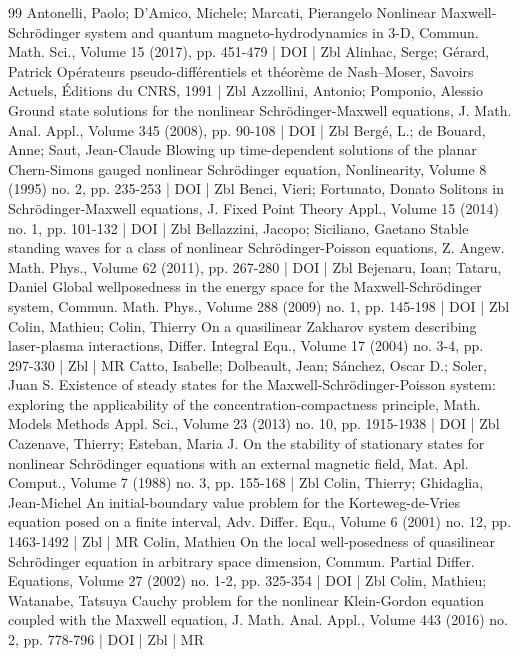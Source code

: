 \documentclass[10pt]{amsart}
\theoremstyle{definition}\newtheorem{defi}[theo]{Definition}\newtheorem{rema}[theo]{Remark}\newtheorem{exam}[theo]{Example}\newtheorem{exem}[theo]{Example}\newtheorem{nota}[theo]{Notation}
\begin{document}
\begin{thebibliography}{99}
Antonelli, Paolo; D’Amico, Michele; Marcati, Pierangelo Nonlinear Maxwell-Schrödinger system and quantum magneto-hydrodynamics in 3-D, Commun. Math. Sci., Volume 15 (2017), pp. 451-479 | DOI | Zbl
Alinhac, Serge; Gérard, Patrick Opérateurs pseudo-différentiels et théorème de Nash–Moser, Savoirs Actuels, Éditions du CNRS, 1991 | Zbl
Azzollini, Antonio; Pomponio, Alessio Ground state solutions for the nonlinear Schrödinger-Maxwell equations, J. Math. Anal. Appl., Volume 345 (2008), pp. 90-108 | DOI | Zbl
Bergé, L.; de Bouard, Anne; Saut, Jean-Claude Blowing up time-dependent solutions of the planar Chern-Simons gauged nonlinear Schrödinger equation, Nonlinearity, Volume 8 (1995) no. 2, pp. 235-253 | DOI | Zbl
Benci, Vieri; Fortunato, Donato Solitons in Schrödinger-Maxwell equations, J. Fixed Point Theory Appl., Volume 15 (2014) no. 1, pp. 101-132 | DOI | Zbl
Bellazzini, Jacopo; Siciliano, Gaetano Stable standing waves for a class of nonlinear Schrödinger-Poisson equations, Z. Angew. Math. Phys., Volume 62 (2011), pp. 267-280 | DOI | Zbl
Bejenaru, Ioan; Tataru, Daniel Global wellposedness in the energy space for the Maxwell-Schrödinger system, Commun. Math. Phys., Volume 288 (2009) no. 1, pp. 145-198 | DOI | Zbl
Colin, Mathieu; Colin, Thierry On a quasilinear Zakharov system describing laser-plasma interactions, Differ. Integral Equ., Volume 17 (2004) no. 3-4, pp. 297-330 | Zbl | MR
Catto, Isabelle; Dolbeault, Jean; Sánchez, Oscar D.; Soler, Juan S. Existence of steady states for the Maxwell-Schrödinger-Poisson system: exploring the applicability of the concentration-compactness principle, Math. Models Methods Appl. Sci., Volume 23 (2013) no. 10, pp. 1915-1938 | DOI | Zbl
Cazenave, Thierry; Esteban, Maria J. On the stability of stationary states for nonlinear Schrödinger equations with an external magnetic field, Mat. Apl. Comput., Volume 7 (1988) no. 3, pp. 155-168 | Zbl
Colin, Thierry; Ghidaglia, Jean-Michel An initial-boundary value problem for the Korteweg-de-Vries equation posed on a finite interval, Adv. Differ. Equ., Volume 6 (2001) no. 12, pp. 1463-1492 | Zbl | MR
Colin, Mathieu On the local well-posedness of quasilinear Schrödinger equation in arbitrary space dimension, Commun. Partial Differ. Equations, Volume 27 (2002) no. 1-2, pp. 325-354 | DOI | Zbl
Colin, Mathieu; Watanabe, Tatsuya Cauchy problem for the nonlinear Klein-Gordon equation coupled with the Maxwell equation, J. Math. Anal. Appl., Volume 443 (2016) no. 2, pp. 778-796 | DOI | Zbl | MR

\end{thebibliography}
\end{document}
